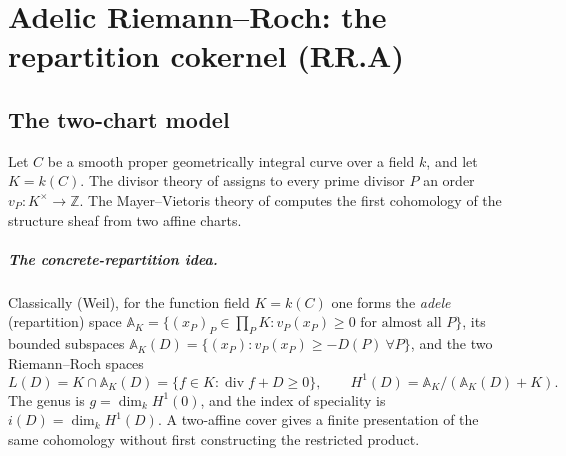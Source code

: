 \chapter{Adelic Riemann--Roch: the repartition cokernel (RR.A)}
\label{chap:RiemannRoch_Adelic}

\section{The two-chart model}
\label{sec:RiemannRoch_Adelic_intro}

Let \(C\) be a smooth proper geometrically integral curve over a field
\(k\), and let \(K=k(C)\).  The divisor theory of
 assigns to every prime divisor \(P\)
an order \(v_P\colon K^\times\to\mathbb Z\).  The Mayer--Vietoris theory
of  computes the first cohomology of
the structure sheaf from two affine charts.

\paragraph{The concrete-repartition idea.}
Classically (Weil), for the function field \(K = k(C)\) one forms the
\emph{adele} (repartition) space
\(\mathbb{A}_K = \{(x_P)_P \in \prod_P K : v_P(x_P) \ge 0 \text{ for
almost all } P\}\), its bounded subspaces
\(\mathbb{A}_K(D) = \{(x_P) : v_P(x_P) \ge -D(P)\ \forall P\}\), and the
two Riemann--Roch spaces
\[
  L(D) = K \cap \mathbb{A}_K(D)
        = \{ f \in K : \operatorname{div} f + D \ge 0\},
  \qquad
  H^1(D) = \mathbb{A}_K / (\mathbb{A}_K(D) + K).
\]
The genus is \(g=\dim_k H^1(0)\), and the index of speciality is
\(i(D)=\dim_k H^1(D)\).  A two-affine cover gives a finite presentation
of the same cohomology without first constructing the restricted product.

